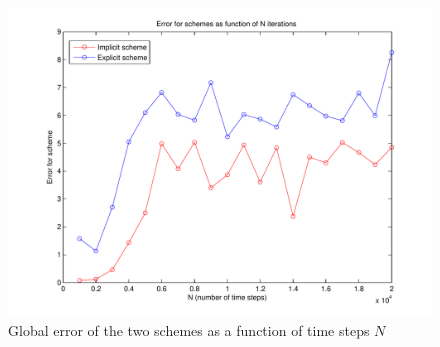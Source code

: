 \begin{figure}[H]
\centering
\includegraphics[scale=0.4]
{../PDFs/Comparisons/error_compare.pdf}
\caption{Global error of the two schemes as a function of time steps $N$}
\label{fig:runTime}
\end{figure}